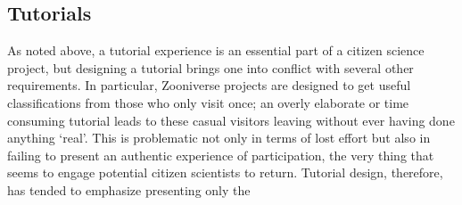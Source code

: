 \documentclass{sigchi}
\begin{document}






\subsection{Tutorials}

As noted above, a tutorial experience is an essential part of a citizen science project, but designing a tutorial brings one into conflict with several other requirements. In particular, Zooniverse projects are designed to get useful classifications from those who only visit once; an overly elaborate or time consuming tutorial leads to these casual visitors leaving without ever having done anything `real'. This is problematic not only in terms of lost effort but also in failing to present an authentic experience of participation, the very thing that seems to engage potential citizen scientists to return. Tutorial design, therefore, has tended to emphasize presenting only the 
\end{document}
